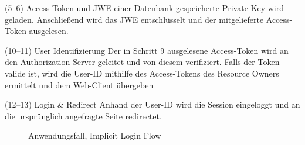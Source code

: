 \begin{labeling}{(5--6) Access-Token und JWE}
    einer Datenbank gespeicherte Private Key wird geladen. Anschließend wird das
    JWE entschlüsselt und der mitgelieferte Access-Token ausgelesen.
    \item[(10--11) User Identifizierung] Der in Schritt 9 ausgelesene
    Access-Token wird an den Authorization Server geleitet und von diesem
    verifiziert. Falls der Token valide ist, wird die User-ID mithilfe des
    Access-Tokens des Resource Owners ermittelt und dem Web-Client übergeben
    \item[(12--13) Login \& Redirect] Anhand der User-ID wird die Session
    eingeloggt und an die ursprünglich angefragte Seite redirectet.
\end{labeling}
\begin{figure}[h]
    \scalebox{.5}{
        
    }
    \caption{Anwendungsfall, Implicit Login Flow}\label{ls: Extended Implicit Authorization TK}
\end{figure} \noindent
